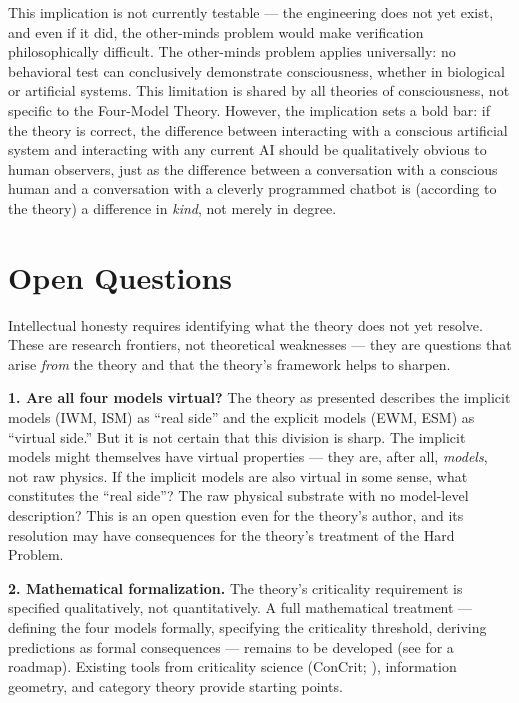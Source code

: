\documentclass[12pt]{article}
\begin{document}
This implication is not currently testable --- the engineering does not yet exist, and even if it did, the other-minds problem would make verification philosophically difficult. The other-minds problem applies universally: no behavioral test can conclusively demonstrate consciousness, whether in biological or artificial systems. This limitation is shared by all theories of consciousness, not specific to the Four-Model Theory. However, the implication sets a bold bar: if the theory is correct, the difference between interacting with a conscious artificial system and interacting with any current AI should be qualitatively obvious to human observers, just as the difference between a conversation with a conscious human and a conversation with a cleverly programmed chatbot is (according to the theory) a difference in \emph{kind}, not merely in degree.



\section{Open Questions}


Intellectual honesty requires identifying what the theory does not yet resolve. These are research frontiers, not theoretical weaknesses --- they are questions that arise \emph{from} the theory and that the theory's framework helps to sharpen.

\textbf{1. Are all four models virtual?} The theory as presented describes the implicit models (IWM, ISM) as ``real side'' and the explicit models (EWM, ESM) as ``virtual side.'' But it is not certain that this division is sharp. The implicit models might themselves have virtual properties --- they are, after all, \emph{models}, not raw physics. If the implicit models are also virtual in some sense, what constitutes the ``real side''? The raw physical substrate with no model-level description? This is an open question even for the theory's author, and its resolution may have consequences for the theory's treatment of the Hard Problem.

\textbf{2. Mathematical formalization.} The theory's criticality requirement is specified qualitatively, not quantitatively. A full mathematical treatment --- defining the four models formally, specifying the criticality threshold, deriving predictions as formal consequences --- remains to be developed (see \citealp{Gruber2026b} for a roadmap). Existing tools from criticality science (ConCrit; \citealp{AlgomShriki2026}), information geometry, and category theory \citep{Kleiner2024} provide starting points.
\end{document}
